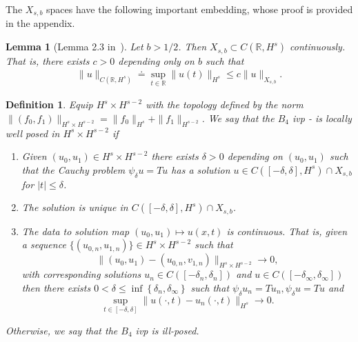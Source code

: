 \documentclass[12pt,reqno]{amsart}
\numberwithin{equation}{section}  %
\renewcommand{\cref}{\Cref}
\newcommand{\rr}{\mathbb{R}}
\newtheorem{lemma}[theorem]{Lemma}
\newtheorem{definition}[theorem]{Definition}
\begin{document}
%
The $X_{s,b}$ spaces have the following important embedding, whose proof is
provided in the appendix.
%
%
%
%
%
%
%
%
\begin{lemma}[Lemma 2.3 in~\cite{Farah:2009uq}]
  Let $b > 1/2$. Then $X_{s, b} \subset C(\rr, H^s)$ continuously. That is,
  there exists $c>0$ depending only on $b$ such that
%
%
\begin{equation*}
\begin{split}
  \| u \|_{C(\rr, H^s)} \doteq \sup_{t \in \rr} \| u(t) \|_{H^s} 
  \le c \| u \|_{X_{s,b}}.
\end{split}
\end{equation*}
%
\label{lem:embedding}
\end{lemma}
%
\begin{definition}
  Equip $H^{s} \times H^{s-2}$ with the 
  topology defined by the norm $\|(f_0, f_1)\|_{H^{s} \times H^{s-2}}
  = \|f_0\|_{H^{s}} + \|f_1\|_{H^{s-2}}$.
   We say that the $B_{4}$ ivp
  \cref{eqn:mb-2}-\cref{eqn:mb-init-data-2} is
	\emph{locally well posed} in
  $H^s \times H^{s-2}$ if 
	\begin{enumerate}
    \item Given $(u_{0}, u_{1}) \in H^{s} \times H^{s-2}$
      there exists $\delta>0$ depending on $(u_{0}, u_{1})$
      such that the Cauchy problem
      $\psi_{\delta} u = Tu$ has a solution $u \in C([-\delta,
      \delta], H^s) \cap X_{s,b}$ for $ |t| \le \delta$.
    \item The solution is unique in $C([-\delta, \delta], H^{s}) \cap
      X_{s,b}$.
    \item
      The data to solution map $(u_0, u_{1}) \mapsto u(x,t)$ is continuous. That
      is, given a sequence $\{(u_{0,n}, u_{1,n} ) \} \in H^{s} \times H^{s-2}$
      such that $$\|(u_{0}, u_{1})
      - (u_{0,n}, v_{1,n}) \|_{H^{s} \times
      H^{s-2}} \to 0,$$ with corresponding solutions $u_{n} \in
      C([-\delta_{n},
      \delta_{n}])$ and $u \in C([-\delta_{\infty}, \delta_{\infty}])$
      then there exists $0 < \delta \le \inf\left\{
      \delta_{n}, \delta_{\infty} \right\}$ such that $\psi_{\delta}u_{n} =
      Tu_{n}, \psi_{\delta}u = Tu$ and 
      $$\sup_{t \in [-\delta, \delta]}
      \|u(\cdot, t) - u_{n}(\cdot, t) \|_{H^s} \to 0.$$
  \end{enumerate}
	Otherwise, we say that the $B_{4}$ ivp is \emph{ill-posed}.
\end{definition}
%
\end{document}

